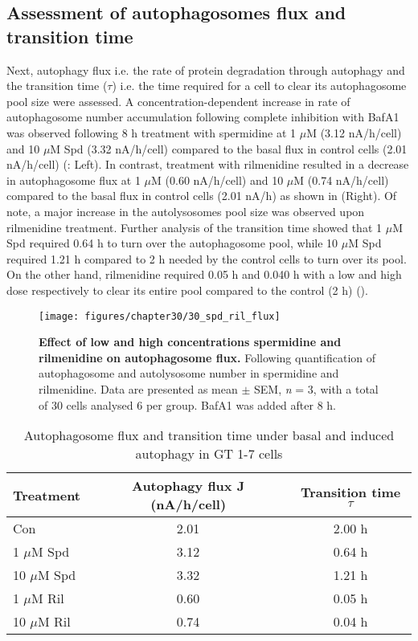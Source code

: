 {\subsection{Assessment of autophagosomes flux and transition time}
Next, autophagy flux i.e. the rate of protein degradation through autophagy \citep{klionsky2016,loos2014} and the transition time ($\tau$) i.e. the time required for a cell to clear its autophagosome pool size \citep{DuToit2018b,loos2014} were assessed. A concentration-dependent increase in rate of autophagosome number accumulation following complete inhibition with BafA1 was observed following 8 h treatment with spermidine at 1 $\mu$M (3.12 nA/h/cell) and 10 $\mu$M Spd (3.32 nA/h/cell) compared to the basal flux in control cells (2.01 nA/h/cell) (: Left). In contrast, treatment with rilmenidine resulted in a decrease in autophagosome flux at 1 $\mu$M (0.60 nA/h/cell) and 10 $\mu$M (0.74 nA/h/cell) compared to the basal flux in control cells (2.01 nA/h) as shown in  (Right). Of note, a major increase in the autolysosomes pool size was observed upon rilmenidine treatment. Further analysis of the transition time showed that 1 $\mu$M Spd required 0.64 h to turn over the autophagosome pool, while 10 $\mu$M Spd required 1.21 h compared to 2 h needed by the control cells to turn over its pool. On the other hand, rilmenidine required 0.05 h and 0.040 h with a low and high dose respectively to clear its entire pool compared to the control (2 h) ().

\begin{figure}[!htbp]
\center
  \texttt{[image: figures/chapter30/30\_spd\_ril\_flux]}
  \caption[Effect of low and high concentrations spermidine and rilmenidine on autophagosome flux]{\textbf{Effect of low and high concentrations spermidine and rilmenidine on autophagosome flux.} Following quantification of autophagosome and autolysosome number in spermidine and rilmenidine. Data are presented as mean $\pm$ SEM, \textit{n} = 3, with a total of 30 cells analysed 6 per group. BafA1 was added after 8 h.}
  \label{fig:30_spd_ril_flux}
\end{figure} 

\begin{table}[!htbp]
\centering
\caption[Autophagosome flux and transition time under basal and induced autophagy in GT 1-7 cells]{Autophagosome flux and transition time under basal and induced autophagy in GT 1-7 cells}
\label{tab:30_flux}
  \begin{tabular}{lcc}
\toprule
Treatment & Autophagy flux J (nA/h/cell) & Transition time $\tau$\\
\midrule
Con & 2.01 & 2.00 h \\
1 $\mu$M Spd & 3.12 & 0.64 h \\
10 $\mu$M Spd & 3.32 & 1.21 h \\
1 $\mu$M Ril & 0.60 & 0.05 h \\
10 $\mu$M Ril & 0.74 & 0.04 h \\
\end{tabular}
\end{table}

}
